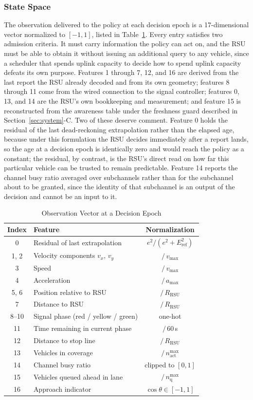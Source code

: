 \documentclass[journal]{IEEEtran}
\begin{document}
\subsubsection{State Space}
The observation delivered to the policy at each decision epoch is a 17-dimensional vector normalized to $[-1, 1]$, listed in Table~\ref{tab:state}. Every entry satisfies two admission criteria. It must carry information the policy can act on, and the RSU must be able to obtain it without issuing an additional query to any vehicle, since a scheduler that spends uplink capacity to decide how to spend uplink capacity defeats its own purpose. Features 1 through 7, 12, and 16 are derived from the last report the RSU already decoded and from its own geometry; features 8 through 11 come from the wired connection to the signal controller; features 0, 13, and 14 are the RSU's own bookkeeping and measurement; and feature 15 is reconstructed from the awareness table under the freshness guard described in Section~\ref{sec:system}-C. Two of these deserve comment. Feature 0 holds the residual of the last dead-reckoning extrapolation rather than the elapsed age, because under this formulation the RSU decides immediately after a report lands, so the age at a decision epoch is identically zero and would reach the policy as a constant; the residual, by contrast, is the RSU's direct read on how far this particular vehicle can be trusted to remain predictable. Feature 14 reports the channel busy ratio averaged over subchannels rather than for the subchannel about to be granted, since the identity of that subchannel is an output of the decision and cannot be an input to it.

\begin{table}[!t]
\centering
\caption{Observation Vector at a Decision Epoch}
\label{tab:state}
\begin{tabular}{clc}
\toprule
\textbf{Index} & \textbf{Feature} & \textbf{Normalization} \\
\midrule
0 & Residual of last extrapolation & $e^2/(e^2+E_{\mathrm{ref}}^2)$ \\
1, 2 & Velocity components $v_x$, $v_y$ & $/\,v_{\max}$ \\
3 & Speed & $/\,v_{\max}$ \\
4 & Acceleration & $/\,a_{\max}$ \\
5, 6 & Position relative to RSU & $/\,R_{\mathrm{RSU}}$ \\
7 & Distance to RSU & $/\,R_{\mathrm{RSU}}$ \\
8--10 & Signal phase (red / yellow / green) & one-hot \\
11 & Time remaining in current phase & $/\,60$\,s \\
12 & Distance to stop line & $/\,R_{\mathrm{RSU}}$ \\
13 & Vehicles in coverage & $/\,n_{\mathrm{act}}^{\max}$ \\
14 & Channel busy ratio & clipped to $[0,1]$ \\
15 & Vehicles queued ahead in lane & $/\,n_{\mathrm{q}}^{\max}$ \\
16 & Approach indicator & $\cos\theta \in [-1,1]$ \\
\bottomrule
\end{tabular}
\end{table}
\end{document}
